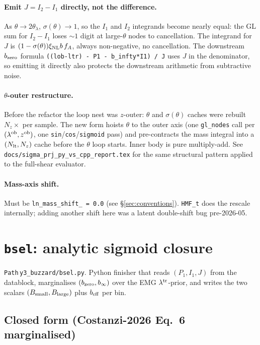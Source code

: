 \documentclass[a4paper, 11pt]{article}
\newcommand{\lob}{\lambda^{\rm ob}}
\newcommand{\ltr}{\lambda^{\rm tr}}
\newcommand{\zob}{z^{\rm ob}}
\newcommand{\xinl}{\xi_{\rm NL}}
\newcommand{\Bsmall}{B_{\rm small}}
\newcommand{\Blarge}{B_{\rm large}}
\newcommand{\modname}[1]{\textcolor{kwcol}{\texttt{#1}}}
\newcommand{\pyfile}[1]{{\small\texttt{#1}}}
\begin{document}
\paragraph{Emit $J = I_2 - I_1$ directly, not the difference.}
As $\theta \to 2\theta_\lambda$, $\sigma(\theta) \to 1$, so the
$I_1$ and $I_2$ integrands become nearly equal: the GL sum for
$I_2 - I_1$ loses $\sim 1$ digit at large-$\theta$ nodes to
cancellation.  The integrand for $J$ is $(1-\sigma(\theta)) \xinl b\,
f_A$, always non-negative, no cancellation.  The downstream
$b_{\rm zero}$ formula \texttt{((lob-ltr) - P1 - b\_infty*I1) / J}
uses $J$ in the denominator, so emitting it directly also protects
the downstream arithmetic from subtractive noise.

\paragraph{$\theta$-outer restructure.}  Before the refactor the loop
nest was $z$-outer: $\theta$ and $\sigma(\theta)$ caches were rebuilt
$N_z \times$ per sample.  The new form hoists $\theta$ to the outer
axis (one \texttt{gl\_nodes} call per $(\lob, \zob)$, one
\texttt{sin}/\texttt{cos}/\texttt{sigmoid} pass) and pre-contracts the
mass integral into a $(N_{\rm lt}, N_z)$ cache before the $\theta$ loop
starts.  Inner body is pure multiply-add.  See
\texttt{docs/sigma\_prj\_py\_vs\_cpp\_report.tex} for the same
structural pattern applied to the full-shear evaluator.

\paragraph{Mass-axis shift.}  Must be \texttt{ln\_mass\_shift\_ =
0.0} (see \S\ref{sec:conventions}).  \texttt{HMF\_t} does the
rescale internally; adding another shift here was a latent
double-shift bug pre-2026-05.

\section{\texttt{bsel}: analytic sigmoid closure}
\label{sec:bsel}

\modname{Path}\,\pyfile{y3\_buzzard/bsel.py}. Python finisher that
reads $(P_1, I_1, J)$ from the datablock, marginalises
$(b_{\rm zero}, b_\infty)$ over the EMG $\ltr$-prior, and writes
the two scalars $(\Bsmall, \Blarge)$ plus $b_{\rm eff}$ per bin.

\subsection{Closed form (Costanzi-2026 Eq.~6 marginalised)}
\end{document}
